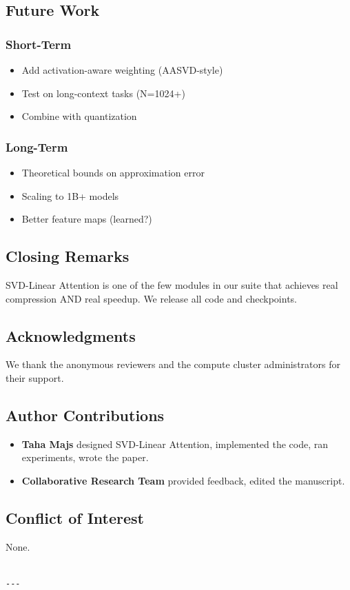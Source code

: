 \subsection{Future Work}

\subsubsection{Short-Term}
\begin{itemize}
\item Add activation-aware weighting (AASVD-style)
\item Test on long-context tasks (N=1024+)
\item Combine with quantization

\end{itemize}
\subsubsection{Long-Term}
\begin{itemize}
\item Theoretical bounds on approximation error
\item Scaling to 1B+ models
\item Better feature maps (learned?)

\end{itemize}
\subsection{Closing Remarks}

SVD-Linear Attention is one of the few modules in our suite that achieves 
real compression AND real speedup. We release all code and checkpoints.

\subsection{Acknowledgments}

We thank the anonymous reviewers and the compute cluster administrators for their support.

\subsection{Author Contributions}

\begin{itemize}
\item \textbf{Taha Majs} designed SVD-Linear Attention, implemented the code,
  ran experiments, wrote the paper.
\item \textbf{Collaborative Research Team} provided feedback, edited the manuscript.

\end{itemize}
\subsection{Conflict of Interest}

None.
\begin{lstlisting}

---
\end{lstlisting}